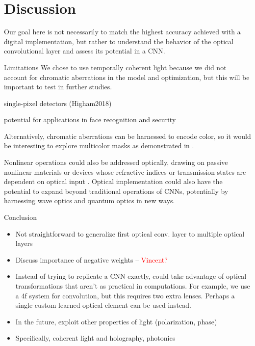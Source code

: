 \documentclass[fleqn,10pt]{wlscirep}
\newcommand{\red}[1]{\textcolor{red}{#1}}
\begin{document}

\section*{Discussion}
\label{sec:discussion}
Our goal here is not necessarily to match the highest accuracy achieved with a digital implementation, but rather to understand the behavior of the optical convolutional layer and assess its potential in a CNN.

Limitations
We chose to use temporally coherent light because we did not account for chromatic aberrations in the model and optimization, but this will be important to test in further studies.

single-pixel detectors (Higham2018)

potential for applications in face recognition and security

Alternatively, chromatic aberrations can be harnessed to encode color, so it would be interesting to explore multicolor masks as demonstrated in \cite{shechtman2016multicolour}.

Nonlinear operations could also be addressed optically, drawing on passive nonlinear materials or devices whose refractive indices or transmission states are dependent on optical input \cite{gibbs2012optical,christodoulides2010nonlinear}. Optical implementation could also have the potential to expand beyond traditional operations of CNNs, potentially by harnessing wave optics and quantum optics in new ways. 

Conclusion
\begin{itemize}
\item Not straightforward to generalize first optical conv. layer to multiple optical layers
\item Discuss importance of negative weights – \red{Vincent?}
\item Instead of trying to replicate a CNN exactly, could take advantage of optical transformations that aren't as practical in computations. For example, we use a 4f system for convolution, but this requires two extra lenses. Perhaps a single custom learned optical element can be used instead.
\item In the future, exploit other properties of light (polarization, phase)	
\item Specifically, coherent light and holography, photonics
\end{itemize}
\end{document}
